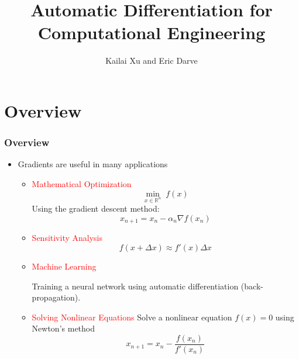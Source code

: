 \documentclass{beamer}
\title[AD]{Automatic Differentiation for Computational Engineering} %
\author[CME 216]{Kailai Xu and Eric Darve} %
\date{}%
\newcommand{\red}[1]{\textcolor{red}{#1}}
\newcommand{\RR}[0]{\mathbb{R}}
\begin{document}
\begin{frame}

\titlepage %

\end{frame}

\section{Overview}

\begin{frame}
	\frametitle{Overview}
	
	\begin{itemize}
		\item Gradients are useful in many applications
	\begin{itemize}
	\item \red{Mathematical Optimization}
		$$\min_{x\in\RR^n} \; f(x)$$
Using the gradient descent method:
$$x_{n+1} = x_n - \alpha_n \nabla f(x_n)$$
	\item \red{Sensitivity Analysis}
	$$f(x+\Delta x) \approx f'(x) \Delta x$$
	\item  \red{Machine Learning}
	
	 Training a neural network using automatic differentiation (back-propagation).
	\item \red{Solving Nonlinear Equations} Solve a nonlinear equation $f(x) = 0$ using Newton's method
	$$x_{n+1} = x_n - \frac{f(x_n)}{f'(x_n)}$$
	\end{itemize}
	
	\end{itemize}
\end{frame}
\end{document}
